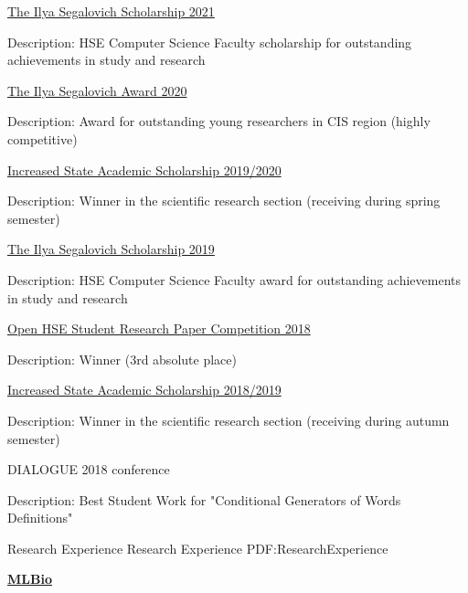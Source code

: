 \documentclass[letterpaper,MMMyyyy,nonstopmode]{simpleresumecv}
\begin{document}
\begin{Body}
\BulletItem
\href{https://cs.hse.ru/en/stipend/}{The Ilya Segalovich Scholarship 2021}
\begin{Detail}
\Item
Description: HSE Computer Science Faculty scholarship for outstanding achievements in study and research
\end{Detail}

\BulletItem
\href{https://yandex.ru/scholarships}{The Ilya Segalovich Award 2020}
\begin{Detail}
\Item
Description: Award for outstanding young researchers in CIS region (highly competitive)
\end{Detail}

\BulletItem
\href{https://www.hse.ru/en/scholarships/academic_raised_demo}{Increased State Academic Scholarship 2019/2020}
\begin{Detail}
\Item
Description: Winner in the scientific research section (receiving during spring semester)
\end{Detail}

\BulletItem
\href{https://cs.hse.ru/en/stipend/}{The Ilya Segalovich Scholarship 2019}
\begin{Detail}
\Item
Description: HSE Computer Science Faculty award for outstanding achievements in study and research
\end{Detail}

\BulletItem
\href{https://nirs.hse.ru/nirs/}{Open HSE Student Research Paper Competition 2018}
\begin{Detail}
\Item
Description: Winner (3rd absolute place)
\end{Detail}

\BulletItem
\href{https://www.hse.ru/en/scholarships/academic_raised_demo}{Increased State Academic Scholarship 2018/2019}
\begin{Detail}
\Item
Description: Winner in the scientific research section (receiving during autumn semester)
\end{Detail}

\BulletItem
DIALOGUE 2018 conference
\begin{Detail}
\Item
Description: Best Student Work for "Conditional Generators of Words Definitions"
\end{Detail}



\Section
{Research Experience}
{Research Experience}
{PDF:ResearchExperience}

\Entry
\href{https://brbiclab.epfl.ch}
{\textbf{MLBio}}


\end{Body}
\end{document}
